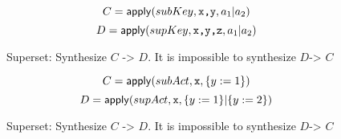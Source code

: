 \begin{figure}[H]
  \[C = \mathsf{apply}(subKey, \texttt{x,y}, a_1 | a_2 )\]
  \[D = \mathsf{apply}(supKey, \texttt{x,y,z}, a_1 | a_2 )\]
  \caption{Superset: Synthesize $C$ -> $D$. It is impossible to synthesize $D$-> $C$}
\end{figure}


\begin{figure}[H]
  \[C = \mathsf{apply}(subAct, \texttt{x}, \{y:=1\} )\]
  \[D = \mathsf{apply}(supAct, \texttt{x}, \{y:=1\}| \{y:=2\})\]
  \caption{Superset: Synthesize $C$ -> $D$. It is impossible to synthesize $D$-> $C$}
\end{figure}